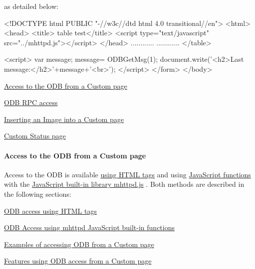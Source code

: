 as detailed below: 
\begin{DoxyCode}
<!DOCTYPE html PUBLIC "-//w3c//dtd html 4.0 transitional//en">
<html>
<head>
<title> table test</title>
<script type="text/javascript" src="../mhttpd.js"></script>
</head>
............
............
</table>

<script>
var message;
message= ODBGetMsg(1);
document.write('<h2>Last message:</h2>'+message+'<br>');
</script>
</form>
</body>
\end{DoxyCode}


\par


\par



\begin{DoxyItemize}
\item \hyperlink{RC_mhttpd_custom_ODB_access}{Access to the ODB from a Custom page}
\item \hyperlink{RC_mhttpd_custom_RPC_access}{ODB RPC access}
\item \hyperlink{RC_mhttpd_Image_access}{Inserting an Image into a Custom page}
\item \hyperlink{RC_mhttpd_custom_status}{Custom Status page}
\end{DoxyItemize}

\par
 \par
 \label{index_end}
\hypertarget{index_end}{}
  \paragraph{Access to the ODB from a Custom page}\label{RC_mhttpd_custom_ODB_access}
\par




\par


Access to the ODB is available \hyperlink{RC_mhttpd_custom_ODB_access_RC_mhttpd_custom_odb_html}{using HTML tags} and using \hyperlink{RC_mhttpd_custom_ODB_access_RC_mhttpd_custom_odb_js}{JavaScript functions} with the \hyperlink{RC_mhttpd_custom_js_lib}{JavaScript built-\/in library mhttpd.js} . Both methods are described in the following sections:


\begin{DoxyItemize}
\item \hyperlink{RC_mhttpd_custom_ODB_access_RC_mhttpd_custom_odb_html}{ODB access using HTML tags}
\item \hyperlink{RC_mhttpd_custom_ODB_access_RC_mhttpd_custom_odb_js}{ODB Access using mhttpd JavaScript built-\/in functions}
\item \hyperlink{RC_mhttpd_custom_ODB_access_examples}{Examples of accessing ODB from a Custom page}
\item \hyperlink{RC_mhttpd_custom_ODB_access_features}{Features using ODB access from a Custom page}
\end{DoxyItemize}

